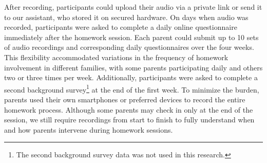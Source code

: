 After recording, participants could upload their audio via a private link or send it to our assistant, who stored it on secured hardware. On days when audio was recorded, participants were asked to complete a daily online questionnaire immediately after the homework session. Each parent could submit up to 10 sets of audio recordings and corresponding daily questionnaires over the four weeks. This flexibility accommodated variations in the frequency of homework involvement in different families, with some parents participating daily and others two or three times per week. Additionally, participants were asked to complete a second background survey\footnote{The second background survey data was not used in this research.} at the end of the first week. To minimize the burden, parents used their own smartphones or preferred devices to record the entire homework process. Although some parents may check in only at the end of the session, we still require recordings from start to finish to fully understand when and how parents intervene during homework sessions. 


